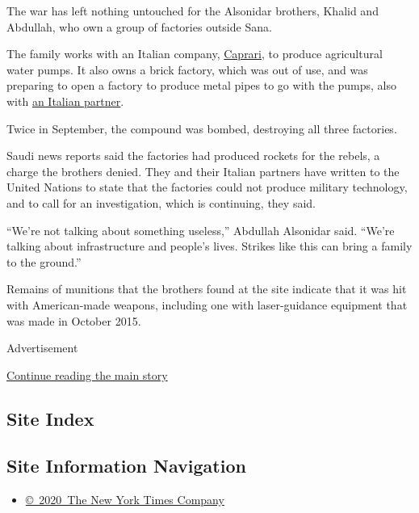 The war has left nothing untouched for the Alsonidar brothers, Khalid
and Abdullah, who own a group of factories outside Sana.

The family works with an Italian company,
\href{http://www.caprari.com/en/welcome.jsp}{Caprari}, to produce
agricultural water pumps. It also owns a brick factory, which was out of
use, and was preparing to open a factory to produce metal pipes to go
with the pumps, also with \href{http://www.addafer.it/}{an Italian
partner}.

Twice in September, the compound was bombed, destroying all three
factories.

Saudi news reports said the factories had produced rockets for the
rebels, a charge the brothers denied. They and their Italian partners
have written to the United Nations to state that the factories could not
produce military technology, and to call for an investigation, which is
continuing, they said.

``We're not talking about something useless,'' Abdullah Alsonidar said.
``We're talking about infrastructure and people's lives. Strikes like
this can bring a family to the ground.''

Remains of munitions that the brothers found at the site indicate that
it was hit with American-made weapons, including one with laser-guidance
equipment that was made in October 2015.

Advertisement

\protect\hyperlink{after-bottom}{Continue reading the main story}

\hypertarget{site-index}{%
\subsection{Site Index}\label{site-index}}

\hypertarget{site-information-navigation}{%
\subsection{Site Information
Navigation}\label{site-information-navigation}}

\begin{itemize}
\tightlist
\item
  \href{https://help.nytimes3xbfgragh.onion/hc/en-us/articles/115014792127-Copyright-notice}{©~2020~The
  New York Times Company}
\end{itemize}

